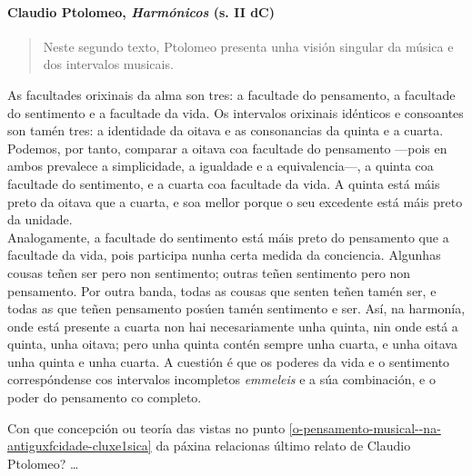 \paragraph{\texorpdfstring{Claudio Ptolomeo, \emph{Harmónicos} (s. II
dC)}{Claudio Ptolomeo, Harmónicos (s. II dC)}}

\begin{quote}
Neste segundo texto, Ptolomeo presenta unha visión singular da música e dos intervalos musicais.
\end{quote}


\begin{multicols}{3}
\setlength{\columnseprule}{1pt}
{\small
\noindent
As facultades orixinais da alma son tres: a facultade do pensamento, a facultade do sentimento e a facultade da vida. Os intervalos orixinais idénticos e consoantes son tamén tres: a identidade da oitava e as consonancias da quinta e a cuarta. Podemos, por tanto, comparar a oitava coa facultade do pensamento ---pois en ambos prevalece a simplicidade, a
igualdade e a equivalencia---, a quinta coa facultade do sentimento, e a cuarta coa facultade da vida. A quinta está máis preto da oitava que a cuarta, e soa mellor porque o seu excedente está máis preto da unidade.\\
Analogamente, a facultade do sentimento está máis preto do pensamento que a facultade da vida, pois participa nunha certa medida da conciencia. Algunhas cousas teñen ser pero non sentimento; outras teñen sentimento pero non pensamento. Por outra banda, todas as cousas que senten teñen tamén ser, e todas as que teñen pensamento posúen tamén sentimento e ser. Así, na harmonía, onde está presente a cuarta non hai necesariamente unha quinta, nin onde está a quinta, unha oitava; pero unha quinta contén sempre unha cuarta, e unha oitava unha quinta e unha cuarta. A cuestión é que os poderes da vida e o sentimento correspóndense cos intervalos incompletos \emph{emmeleis} e a súa combinación, e o poder do pensamento co completo.
}
\end{multicols}

\begin{ejercicio}[]
Con que concepción ou teoría das vistas no punto \ref{o-pensamento-musical--na-antiguxfcidade-cluxe1sica} da páxina \pageref{o-pensamento-musical--na-antiguxfcidade-cluxe1sica} relacionas último relato de Claudio Ptolomeo? \ldots
 \vspace*{0.50cm} %
\end{ejercicio}
%


